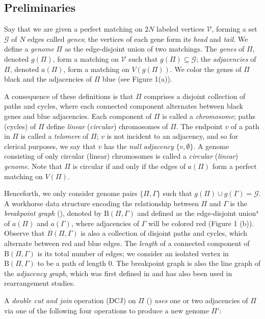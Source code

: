 \subsection*{Preliminaries}
Say that we are given a perfect matching on $2N$ labeled vertices $\mathcal{V}$, forming a set $\mathcal{G}$ of $N$ edges called {\em genes}; the vertices of each gene form its {\em head} and {\em tail}.  We define a {\em genome} $\Pi$ as the edge-disjoint union of two matchings.  The {\em genes} of $\Pi$, denoted $g(\Pi)$, form a matching on $\mathcal{V}$ such that $g(\Pi) \subseteq \mathcal{G}$; the {\em adjacencies} of $\Pi$, denoted $a(\Pi)$, form a matching on $V(g(\Pi))$.  We color the genes of $\Pi$ black and the adjacencies of $\Pi$ blue (see Figure 1(a)).

A consequence of these definitions is that $\Pi$ comprises a disjoint collection of paths and cycles, where each connected component alternates between black genes and blue adjacencies.  Each component of $\Pi$ is called a {\em chromosome}; paths (cycles) of $\Pi$ define {\em linear} ({\em circular}) chromosomes of $\Pi$.  The endpoint $v$ of a path in $\Pi$ is called a {\em telomere} of $\Pi$; $v$ is not incident to an adjacency, and so for clerical purposes, we say that $v$ has the {\em null adjacency} $\{v, \emptyset\}$.  A genome consisting of only circular (linear) chromosomes is called a {\em circular} ({\em linear}) {\em genome}.  Note that $\Pi$ is circular if and only if the edges of $a(\Pi)$ form a perfect matching on $V(\Pi)$.

Henceforth, we only consider genome pairs $\{\Pi, \Gamma\}$ such that $g(\Pi) \cup g(\Gamma) = \mathcal{G}$.  A workhorse data structure encoding the relationship between $\Pi$ and $\Gamma$ is the {\em breakpoint graph} (\cite{bafna}), denoted by $\mathrm{B}(\Pi, \Gamma)$ and defined as the edge-disjoint union$^\textrm{a}$ of $a(\Pi)$ and $a(\Gamma)$, where adjacencies of $\Gamma$ will be colored red (Figure 1 (b)).  Observe that $B(\Pi, \Gamma)$ is also a collection of disjoint paths and cycles, which alternate between red and blue edges.  The {\em length} of a connected component of $\mathrm{B}(\Pi, \Gamma)$ is its total number of edges; we consider an isolated vertex in $\mathrm{B}(\Pi, \Gamma)$ to be a path of length $0$.
The breakpoint graph is also the line graph of the {\em adjacency graph}, which was first defined in \cite{bergeron} and has also been used in rearrangement studies.

A {\em double cut and join} operation (DCJ) on $\Pi$ (\cite{yancopoulos}) {\em uses} one or two adjacencies of $\Pi$ via one of the following four operations to produce a new genome $\Pi'$:

